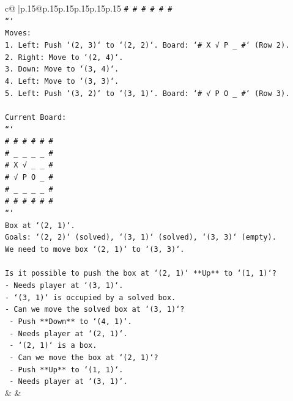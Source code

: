 \documentclass{article}
\begin{document}
{\begin{supertabular}{c@{$\;$}|p{.15\linewidth}@{}p{.15\linewidth}p{.15\linewidth}p{.15\linewidth}p{.15\linewidth}p{.15\linewidth}}
{{{\texttt{\# \# \# \# \# \#} \\
\texttt{```} \\
\texttt{Moves:} \\
\texttt{1. Left: Push `(2, 3)` to `(2, 2)`. Board: `\# X √ P \_ \#` (Row 2).} \\
\texttt{2. Right: Move to `(2, 4)`.} \\
\texttt{3. Down: Move to `(3, 4)`.} \\
\texttt{4. Left: Move to `(3, 3)`.} \\
\texttt{5. Left: Push `(3, 2)` to `(3, 1)`. Board: `\# √ P O \_ \#` (Row 3).} \\
\\ 
\texttt{Current Board:} \\
\texttt{```} \\
\texttt{\# \# \# \# \# \#} \\
\texttt{\# \_ \_ \_ \_ \#} \\
\texttt{\# X √ \_ \_ \#} \\
\texttt{\# √ P O \_ \#} \\
\texttt{\# \_ \_ \_ \_ \#} \\
\texttt{\# \# \# \# \# \#} \\
\texttt{```} \\
\texttt{Box at `(2, 1)`.} \\
\texttt{Goals: `(2, 2)` (solved), `(3, 1)` (solved), `(3, 3)` (empty).} \\
\texttt{We need to move box `(2, 1)` to `(3, 3)`.} \\
\\ 
\texttt{Is it possible to push the box at `(2, 1)` **Up** to `(1, 1)`?} \\
\texttt{{-} Needs player at `(3, 1)`.} \\
\texttt{{-} `(3, 1)` is occupied by a solved box.} \\
\texttt{{-} Can we move the solved box at `(3, 1)`?} \\
\texttt{  {-} Push **Down** to `(4, 1)`.} \\
\texttt{  {-} Needs player at `(2, 1)`.} \\
\texttt{  {-} `(2, 1)` is a box.} \\
\texttt{  {-} Can we move the box at `(2, 1)`?} \\
\texttt{    {-} Push **Up** to `(1, 1)`.} \\
\texttt{    {-} Needs player at `(3, 1)`.} \\
            }
        }
    }
    & & \\ \\


\end{supertabular}}
\end{document}
